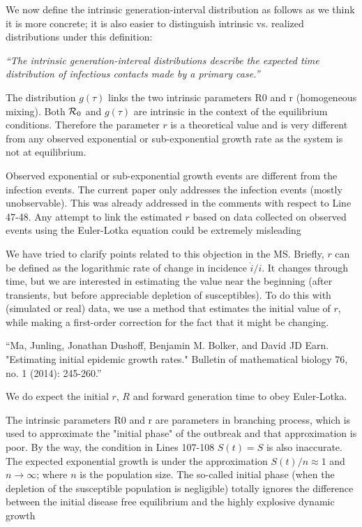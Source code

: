 \documentclass[12pt]{article}
\newcommand{\Rx}[1]{\ensuremath{{\cal R}_{#1}}}
\newcommand{\Ro}{\Rx{0}}
\newcommand{\revtext}{\textsf}
\newcommand{\newtext}[1]{\textsl{``#1''}}
\begin{document}
We now define the intrinsic generation-interval distribution as follows as we think it is more concrete; it is also easier to distinguish intrinsic vs. realized distributions under this definition:

\newtext{The \emph{intrinsic} generation-interval distributions describe the expected time distribution of infectious contacts made by a primary case.}

\revtext{The distribution $g(\tau)$ links the two intrinsic parameters R0 and r
(homogeneous mixing). Both $\Ro$ and $g(\tau)$ are intrinsic in the context of the equilibrium conditions. Therefore the parameter $r$ is a theoretical value and is very different from any observed exponential
or sub-exponential growth rate as the system is not at equilibrium.}

\revtext{Observed exponential or sub-exponential growth events are different from the infection events. The current paper only addresses the infection events (mostly unobservable). This was
already addressed in the comments with respect to Line 47-48.
Any attempt to link the estimated $r$ based on data collected
on observed events using the Euler-Lotka equation could be extremely misleading}

We have tried to clarify points related to this objection in the MS. 
Briefly, $r$ can be defined as the logarithmic rate of change in incidence $\dot i/i$. It changes through time, but we are interested in estimating the value near the beginning (after transients, but before appreciable depletion of susceptibles). To do this with (simulated or real) data, we use a method that estimates the initial value of $r$, while making a first-order correction for the fact that it might be changing.

``Ma, Junling, Jonathan Dushoff, Benjamin M. Bolker, and David JD Earn. "Estimating initial epidemic growth rates." Bulletin of mathematical biology 76, no. 1 (2014): 245-260.''

We do expect the initial $r$, $R$ and forward generation time to obey Euler-Lotka.

\revtext{
The intrinsic parameters R0 and r are parameters in branching
process, which is used to approximate the "initial phase" of the
outbreak and that approximation is poor. By the way, the condition in Lines 107-108 $S(t) = S$ is also inaccurate. The expected exponential growth is under the approximation $S(t)/n \approx 1$ and
$n \to \infty$; where $n$ is the population size. The so-called initial
phase (when the depletion of the susceptible population is negligible) totally ignores the difference between the initial disease free equilibrium and the highly explosive dynamic growth
}
\end{document}
